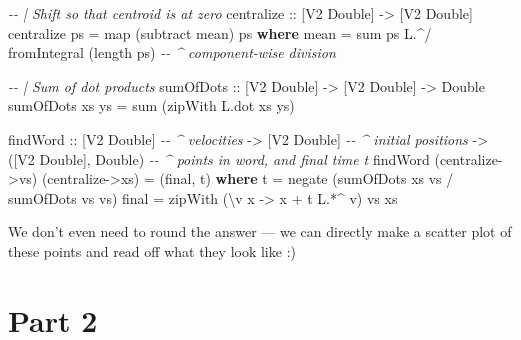 \documentclass[]{article}
\newenvironment{Shaded}{}{}
\newcommand{\CommentTok}[1]{\textcolor[rgb]{0.38,0.63,0.69}{\textit{#1}}}
\newcommand{\DataTypeTok}[1]{\textcolor[rgb]{0.56,0.13,0.00}{#1}}
\newcommand{\FunctionTok}[1]{\textcolor[rgb]{0.02,0.16,0.49}{#1}}
\newcommand{\KeywordTok}[1]{\textcolor[rgb]{0.00,0.44,0.13}{\textbf{#1}}}
\newcommand{\NormalTok}[1]{#1}
\newcommand{\OperatorTok}[1]{\textcolor[rgb]{0.40,0.40,0.40}{#1}}
\newcommand{\OtherTok}[1]{\textcolor[rgb]{0.00,0.44,0.13}{#1}}
\begin{document}
\begin{Shaded}
\begin{Highlighting}[]
\CommentTok{{-}{-} | Shift so that centroid is at zero}
\OtherTok{centralize ::}\NormalTok{ [}\DataTypeTok{V2} \DataTypeTok{Double}\NormalTok{] }\OtherTok{{-}\textgreater{}}\NormalTok{ [}\DataTypeTok{V2} \DataTypeTok{Double}\NormalTok{]}
\NormalTok{centralize ps }\OtherTok{=} \FunctionTok{map}\NormalTok{ (}\FunctionTok{subtract}\NormalTok{ mean) ps}
  \KeywordTok{where}
\NormalTok{    mean }\OtherTok{=} \FunctionTok{sum}\NormalTok{ ps }\OperatorTok{L.\^{}/} \FunctionTok{fromIntegral}\NormalTok{ (}\FunctionTok{length}\NormalTok{ ps)}
                \CommentTok{{-}{-} \^{} component{-}wise division}

\CommentTok{{-}{-} | Sum of dot products}
\OtherTok{sumOfDots ::}\NormalTok{ [}\DataTypeTok{V2} \DataTypeTok{Double}\NormalTok{] }\OtherTok{{-}\textgreater{}}\NormalTok{ [}\DataTypeTok{V2} \DataTypeTok{Double}\NormalTok{] }\OtherTok{{-}\textgreater{}} \DataTypeTok{Double}
\NormalTok{sumOfDots xs ys }\OtherTok{=} \FunctionTok{sum}\NormalTok{ (}\FunctionTok{zipWith}\NormalTok{ L.dot xs ys)}

\NormalTok{findWord}
\OtherTok{    ::}\NormalTok{ [}\DataTypeTok{V2} \DataTypeTok{Double}\NormalTok{]              }\CommentTok{{-}{-} \^{} velocities}
    \OtherTok{{-}\textgreater{}}\NormalTok{ [}\DataTypeTok{V2} \DataTypeTok{Double}\NormalTok{]              }\CommentTok{{-}{-} \^{} initial positions}
    \OtherTok{{-}\textgreater{}}\NormalTok{ ([}\DataTypeTok{V2} \DataTypeTok{Double}\NormalTok{], }\DataTypeTok{Double}\NormalTok{)    }\CommentTok{{-}{-} \^{} points in word, and final time t}
\NormalTok{findWord (centralize}\OtherTok{{-}\textgreater{}}\NormalTok{vs) (centralize}\OtherTok{{-}\textgreater{}}\NormalTok{xs) }\OtherTok{=}\NormalTok{ (final, t)}
  \KeywordTok{where}
\NormalTok{    t     }\OtherTok{=} \FunctionTok{negate}\NormalTok{ (sumOfDots xs vs }\OperatorTok{/}\NormalTok{ sumOfDots vs vs)}
\NormalTok{    final }\OtherTok{=} \FunctionTok{zipWith}\NormalTok{ (\textbackslash{}v x }\OtherTok{{-}\textgreater{}}\NormalTok{ x }\OperatorTok{+}\NormalTok{ t }\OperatorTok{L.*\^{}}\NormalTok{ v) vs xs}
\end{Highlighting}
\end{Shaded}

We don't even need to round the answer --- we can directly make a scatter plot
of these points and read off what they look like :)

\section{Part 2}\label{part-2}
\end{document}
